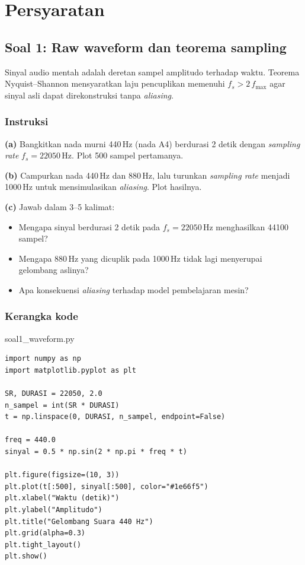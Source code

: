 \documentclass[12pt, a4paper]{article}
\begin{document}
\section{Persyaratan}\label{sec:requirements}

\subsection{Soal 1: Raw waveform dan teorema sampling}
\label{sec:soal1}

Sinyal audio mentah adalah deretan sampel amplitudo terhadap waktu. Teorema Nyquist--Shannon mensyaratkan laju pencuplikan memenuhi $f_s > 2\,f_{\max}$ agar sinyal asli dapat direkonstruksi tanpa \emph{aliasing}.

\subsubsection{Instruksi}
\label{sec:soal1-instruksi}

\textbf{(a)} Bangkitkan nada murni 440\,Hz (nada A4) berdurasi 2 detik dengan \emph{sampling rate} $f_s = 22050$\,Hz. Plot 500 sampel pertamanya.

\textbf{(b)} Campurkan nada 440\,Hz dan 880\,Hz, lalu turunkan \emph{sampling rate} menjadi 1000\,Hz untuk mensimulasikan \emph{aliasing}. Plot hasilnya.

\textbf{(c)} Jawab dalam 3--5 kalimat:
\begin{itemize}
  \item Mengapa sinyal berdurasi 2 detik pada $f_s = 22050$\,Hz menghasilkan 44100 sampel?
  \item Mengapa 880\,Hz yang dicuplik pada 1000\,Hz tidak lagi menyerupai gelombang aslinya?
  \item Apa konsekuensi \emph{aliasing} terhadap model pembelajaran mesin?
\end{itemize}

\subsubsection{Kerangka kode}
\label{sec:soal1-kode}

\begin{codewindow}{soal1\_waveform.py}
\begin{lstlisting}[style=pycode]
import numpy as np
import matplotlib.pyplot as plt

SR, DURASI = 22050, 2.0
n_sampel = int(SR * DURASI)
t = np.linspace(0, DURASI, n_sampel, endpoint=False)

freq = 440.0
sinyal = 0.5 * np.sin(2 * np.pi * freq * t)

plt.figure(figsize=(10, 3))
plt.plot(t[:500], sinyal[:500], color="#1e66f5")
plt.xlabel("Waktu (detik)")
plt.ylabel("Amplitudo")
plt.title("Gelombang Suara 440 Hz")
plt.grid(alpha=0.3)
plt.tight_layout()
plt.show()
\end{lstlisting}
\end{codewindow}
\end{document}
